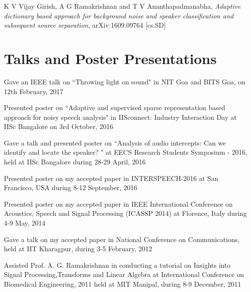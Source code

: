 \documentclass[line]{resume}
\begin{document}
{\begin{resume}
\begin{list2}
		\item  K V Vijay Girish, A G Ramakrishnan and T V Ananthapadmanabha,  \textit{Adaptive dictionary based approach for background noise and speaker classification and subsequent source separation}, 	arXiv:1609.09764 [cs.SD]
		\end{list2}
			\vspace{-2.5mm}
			\section{\mysidestyle Talks and Poster Presentations} 
			\vspace{5mm}
			\begin{list2}
			\item Gave an IEEE talk on ``Throwing light on sound" in NIT Goa and BITS Goa, on 12th February, 2017
			\item Presented poster on ``Adaptive and supervised sparse representation based approach for noisy speech analysis"  in IISconnect: Industry Interaction Day at IISc  Bangalore on 3rd October, 2016 
			
			\item Gave a talk and presented poster on ``Analysis of audio intercepts: Can we identify and locate the speaker? " at EECS Research Students Symposium - 2016,  held at IISc Bangalore during 28-29 April, 2016
			
			
			\item 
			Presented poster on my accepted paper in INTERSPEECH-2016 at San Francisco, USA during 8-12 September, 2016
			
			
			\item Presented poster on my accepted paper in IEEE International Conference on Acoustics, Speech and Signal Processing (ICASSP 2014) at Florence, Italy  during  4-9 May, 2014
			
			\item 
			
			Gave a talk on my accepted paper in  National Conference on Communications,  held at IIT Kharagpur, during 3-5 February, 2012
			
			\item Assisted Prof. A. G. Ramakrishnan in conducting a tutorial on Insights into Signal Processing,Transforms and Linear Algebra at International Conference on Biomedical Engineering, 2011 held at MIT Manipal, during 8-9 December, 2011
			

\end{list2}
\end{resume}}
\end{document}
